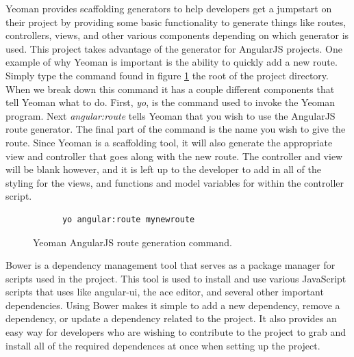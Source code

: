 Yeoman provides scaffolding generators to help developers get a jumpstart on their project by providing some basic functionality to generate things like routes, controllers, views, and other various components depending on which generator is used. This project takes advantage of the generator for AngularJS projects. One example of why Yeoman is important is the ability to quickly add a new route. Simply type the command found in figure \ref{yeomanAngularFig} the root of the project directory. When we break down this command it has a couple different components that tell Yeoman what to do. First, \emph{yo}, is the command used to invoke the Yeoman program. Next \emph{angular:route} tells Yeoman that you wish to use the AngularJS route generator. The final part of the command is the name you wish to give the route. Since Yeoman is a scaffolding tool, it will also generate the appropriate view and controller that goes along with the new route. The controller and view will be blank however, and it is left up to the developer to add in all of the styling for the views, and functions and model variables for within the controller script.

\begin{figure}[H]
  \begin{center}
    \renewcommand{\theFancyVerbLine}{
      \sffamily\textcolor[rgb]{0.5,0.5,0.5}{\scriptsize\arabic{FancyVerbLine}}}
    \begin{verbatim}
      yo angular:route mynewroute
    \end{verbatim}

  \end{center}
  \caption{Yeoman AngularJS route generation command.}
  \label{yeomanAngularFig}
\end{figure}

Bower\cite{Note:Bower:2014} is a dependency management tool that serves as a package manager for scripts used in the project. This tool is used to install and use various JavaScript scripts that \projectName{} uses like angular-ui, the ace editor, and several other important dependencies. Using Bower makes it simple to add a new dependency, remove a dependency, or update a dependency related to the project. It also provides an easy way for developers who are wishing to contribute to the project to grab and install all of the required dependences at once when setting up the project.

